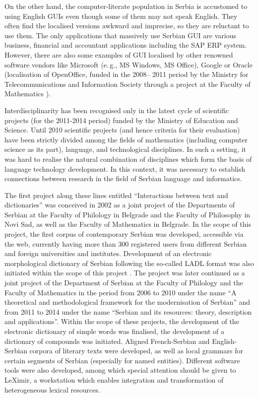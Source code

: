 \begin{multicols}{2}
On the other hand, the computer-literate population in Serbia is accustomed to using English GUIs even though some of them may not speak English. They often find the localised versions awkward and imprecise, so they are reluctant to use them. The only applications that massively use Serbian GUI are various business, financial and accountant applications including the SAP ERP system. However, there are also some examples of GUI localised by other renowned software vendors like Microsoft (e.\,g., MS Windows, MS Office), Google or Oracle (localisation of OpenOffice, funded in the 2008-- 2011 period by the Ministry for Telecommunications and Information Society through a project at the Faculty of Mathematics \cite{OO_MATF}).

Interdisciplinarity has been recognised only in the latest cycle of scientific projects (for the 2011-2014 period) funded by the Ministry of Education and Science. Until 2010 scientific projects (and hence criteria for their evaluation) have been strictly divided among the fields of mathematics (including computer science as its part), language, and technological disciplines. In such a setting, it was hard to realise the natural combination of disciplines which form the basis of language technology development. In this context, it was necessary to establish connections between research in the field of Serbian language and informatics. 

The first project along these lines entitled “Interactions between text and dictionaries” was conceived in 2002 as a joint project of the Departments of Serbian at the Faculty of Philology in Belgrade and the Faculty of Philosophy in Novi Sad, as well as the Faculty of Mathematics in Belgrade. In the scope of this project, the first corpus of contemporary Serbian was developed, \cite{KORPUS} accessible via the web, currently having more than 300 registered users from different Serbian and foreign universities and institutes. Development of an electronic morphological dictionary of Serbian following the so-called LADL format was also initiated within the scope of this project \cite{KRSTEV}. The project was later continued as a joint project of the Department of Serbian at the Faculty of Philology and the Faculty of Mathematics in the period from 2006 to 2010 under the name “A theoretical and methodological framework for the modernisation of Serbian” and from 2011 to 2014 under the name “Serbian and its resources: theory, description and applications”. Within the scope of these projects, the development of the electronic dictionary of simple words was finalised, the development of a dictionary of compounds was initiated. Aligned French-Serbian and English-Serbian corpora of literary texts were developed, as well as local grammars for certain segments of Serbian (especially for named entities). Different software tools were also developed, among which special attention should be given to LeXimir, a workstation which enables integration and transformation of heterogeneous lexical resources.
 

\end{multicols}

